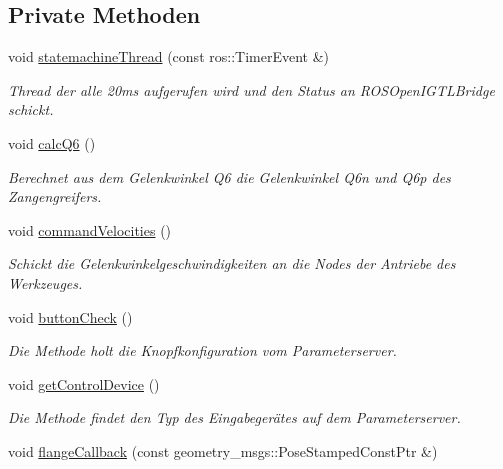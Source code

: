 \subsection*{Private Methoden}
\begin{DoxyCompactItemize}
\item 
void \hyperlink{classGeometricKinematicCommander_a85c8118bd74639548f6791880aeb8f81}{statemachine\-Thread} (const ros\-::\-Timer\-Event \&)
\begin{DoxyCompactList}\small\item\em Thread der alle 20ms aufgerufen wird und den Status an R\-O\-S\-Open\-I\-G\-T\-L\-Bridge schickt. \end{DoxyCompactList}\item 
void \hyperlink{classGeometricKinematicCommander_a8f2f1e6428ae88ccdd630d59eff6d5af}{calc\-Q6} ()
\begin{DoxyCompactList}\small\item\em Berechnet aus dem Gelenkwinkel Q6 die Gelenkwinkel Q6n und Q6p des Zangengreifers. \end{DoxyCompactList}\item 
void \hyperlink{classGeometricKinematicCommander_a79cc755ef52804b1cbd1e71dd2f77339}{command\-Velocities} ()
\begin{DoxyCompactList}\small\item\em Schickt die Gelenkwinkelgeschwindigkeiten an die Nodes der Antriebe des Werkzeuges. \end{DoxyCompactList}\item 
void \hyperlink{classGeometricKinematicCommander_a54f853173048f2d5b55c00d711e3542a}{button\-Check} ()
\begin{DoxyCompactList}\small\item\em Die Methode holt die Knopfkonfiguration vom Parameterserver. \end{DoxyCompactList}\item 
void \hyperlink{classGeometricKinematicCommander_a91fbbc67883244f37fff899029855140}{get\-Control\-Device} ()
\begin{DoxyCompactList}\small\item\em Die Methode findet den Typ des Eingabegerätes auf dem Parameterserver. \end{DoxyCompactList}\item 
\hypertarget{classGeometricKinematicCommander_a61edc35487744095113c99b29b7c57bd}{void \hyperlink{classGeometricKinematicCommander_a61edc35487744095113c99b29b7c57bd}{flange\-Callback} (const geometry\-\_\-msgs\-::\-Pose\-Stamped\-Const\-Ptr \&)}\label{classGeometricKinematicCommander_a61edc35487744095113c99b29b7c57bd}


\end{DoxyCompactItemize}
